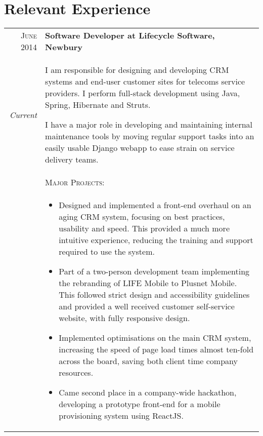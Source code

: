 \section{Relevant Experience}
\begin{tabular}{r|p{11cm}}
	\textsc{June 2014} & \textbf{Software Developer at Lifecycle Software, Newbury} \\
	\emph{Current} & \footnotesize{I am responsible for designing and developing CRM systems and end-user customer sites for telecoms service providers. I perform full-stack development using Java, Spring, Hibernate and Struts.

	I have a major role in developing and maintaining internal maintenance tools by moving regular support tasks into an easily usable Django webapp to ease strain on service delivery teams.
	} \\

		\ & \vspace{1pt}  \textsc{Major Projects}: \\
	&\vspace{-0.9em}\begin{itemize}[itemsep=0pt,topsep=0pt,leftmargin=*]\footnotesize
		\item Designed and implemented a front-end overhaul on an aging CRM system, focusing on best practices, usability and speed. This provided a much more intuitive experience, reducing the training and support required to use the system.
		\item Part of a two-person development team implementing the rebranding of LIFE Mobile to Plusnet Mobile. This followed strict design and accessibility guidelines and provided a well received customer self-service website, with fully responsive design. 
		\item Implemented optimisations on the main CRM system, increasing the speed of page load times almost ten-fold across the board, saving both client time company resources.
		\item Came second place in a company-wide hackathon, developing a prototype front-end for a mobile provisioning system using ReactJS.
	\end{itemize}\vspace{-1.5em}

\end{tabular}